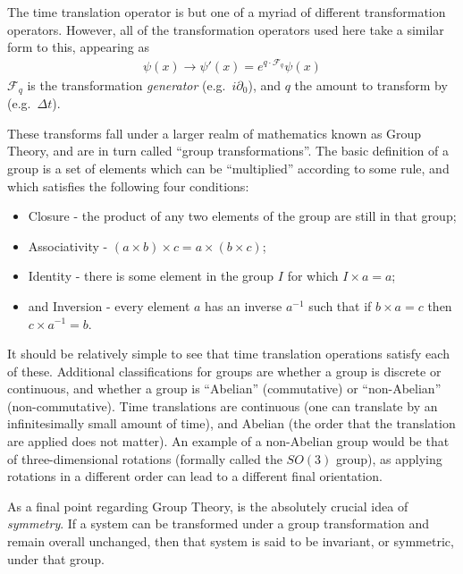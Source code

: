     The time translation operator is but one of a myriad of different transformation operators.
    However, all of the transformation operators used here take a similar form to this, appearing as
    \begin{equation} \begin{split}
        \psi(x) \to \psi'(x) = e^{ q \cdot \mathcal{F}_q } \psi(x)
    \end{split} \end{equation}
    $\mathcal{F}_q$ is the transformation \textit{generator} (e.g.\ $i\partial_0$),
        and $q$ the amount to transform by (e.g.\ $\Delta t$).

    These transforms fall under a larger realm of mathematics known as Group Theory,
        and are in turn called ``group transformations''.
    The basic definition of a group is a set of elements which can be ``multiplied'' according to some rule,
        and which satisfies the following four conditions\cite{Cheng_book}:
    \begin{itemize}
        \item Closure - the product of any two elements of the group are still in that group;
        \item Associativity - $(a \times b)\times c = a\times(b \times c)$;
        \item Identity - there is some element in the group $I$ for which $I \times a=a$;
        \item and Inversion - every element $a$ has an inverse $a^{-1}$ such that if $b \times a = c$ then $c \times a^{-1} = b$.
    \end{itemize}

    It should be relatively simple to see that time translation operations satisfy each of these.
    Additional classifications for groups are whether a group is discrete or continuous,
        and whether a group is ``Abelian'' (commutative) or ``non-Abelian'' (non-commutative).
    Time translations are continuous (one can translate by an infinitesimally small amount of time),
        and Abelian (the order that the translation are applied does not matter).
    An example of a non-Abelian group would be that of three-dimensional rotations (formally called the $SO(3)$ group),
        as applying rotations in a different order can lead to a different final orientation.

    As a final point regarding Group Theory, is the absolutely crucial idea of \textit{symmetry}.
    If a system can be transformed under a group transformation and remain overall unchanged,
        then that system is said to be invariant, or symmetric, under that group.

